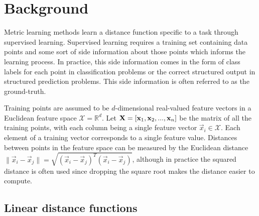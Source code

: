 \section{Background}











Metric learning methods learn a distance function specific to a task through supervised learning. Supervised learning requires a training set containing data points and some sort of side information about those points which informs the learning process. In practice, this side information comes in the form of class labels for each point in classification problems or the correct structured output in structured prediction problems. This side information is often referred to as the ground-truth.

Training points are assumed to be $d$-dimensional real-valued feature vectors in a Euclidean feature space $\mathcal{X} = \mathbb{R}^d$. Let $\mathbf{X} = \left[ \mathbf{x}_1, \mathbf{x}_2, ..., \mathbf{x}_n \right]$ be the matrix of all the training points, with each column being a single feature vector $\vec{x}_i \in \mathcal{X}$. Each element of a training vector corresponds to a single feature value. Distances between points in the feature space can be measured by the Euclidean distance $\|\vec{x}_i - \vec{x}_j\| = \sqrt{(\vec{x}_i - \vec{x}_j)^T(\vec{x}_i - \vec{x}_j)}$, although in practice the squared distance is often used since dropping the square root makes the distance easier to compute.



\subsection{Linear distance functions}

